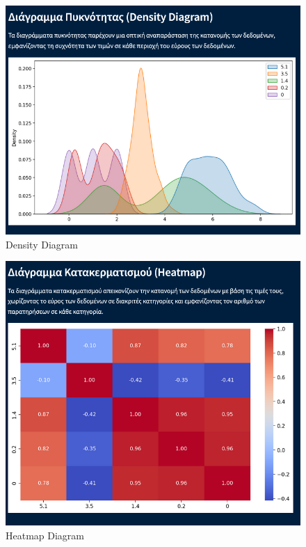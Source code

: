 \documentclass[unnumsec,webpdf,contemporary,large]{oup-authoring-template}%
\theoremstyle{thmstyleone}%
\theoremstyle{thmstyletwo}%
\theoremstyle{thmstylethree}%
\begin{document}
\begin{figure}
    \centering
    \includegraphics[width=1\linewidth]{images/density.png}
    \caption{Density Diagram}
    \label{fig:density}
\end{figure}

\begin{figure}
    \centering
    \includegraphics[width=1\linewidth]{images/heatmap.png}
    \caption{Heatmap Diagram}
    \label{fig:heatmap}
\end{figure}
\end{document}
